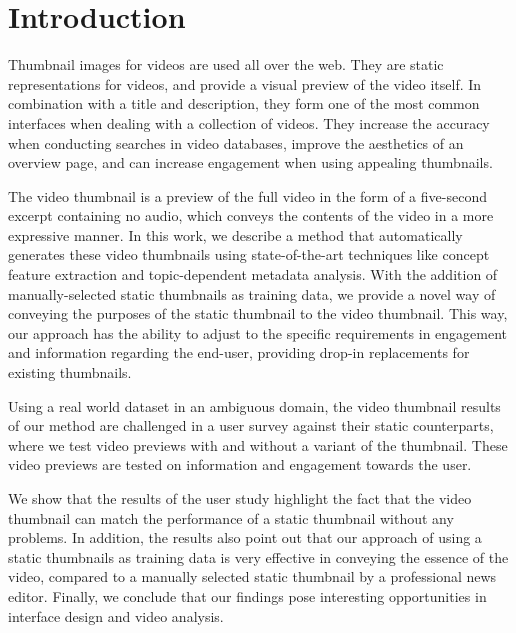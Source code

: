 \documentclass{../resources/sig-alternate-05-2015}
\begin{document}

\printccsdesc


\section{Introduction}
\label{introduction}




Thumbnail images for videos are used all over the web. They are static representations for videos, and provide a visual preview of the video itself. In combination with a title and description, they form one of the most common interfaces when dealing with a collection of videos. They increase the accuracy when conducting searches in video databases, improve the aesthetics of an overview page, and can increase engagement when using appealing thumbnails.

The video thumbnail is a preview of the full video in the form of a five-second excerpt containing no audio, which conveys the contents of the video in a more expressive manner. In this work, we describe a method that automatically generates these video thumbnails using state-of-the-art techniques like concept feature extraction and topic-dependent metadata analysis. With the addition of manually-selected static thumbnails as training data, we provide a novel way of conveying the purposes of the static thumbnail to the video thumbnail. This way, our approach has the ability to adjust to the specific requirements in engagement and information regarding the end-user, providing drop-in replacements for existing thumbnails.

Using a real world dataset in an ambiguous domain, the video thumbnail results of our method are challenged in a user survey against their static counterparts, where we test video previews with and without a variant of the thumbnail. These video previews are tested on information and engagement towards the user.

We show that the results of the user study highlight the fact that the video thumbnail can match the performance of a static thumbnail without any problems. In addition, the results also point out that our approach of using a static thumbnails as training data is very effective in conveying the essence of the video, compared to a manually selected static thumbnail by a professional news editor. Finally, we conclude that our findings pose interesting opportunities in interface design and video analysis.
\end{document}
